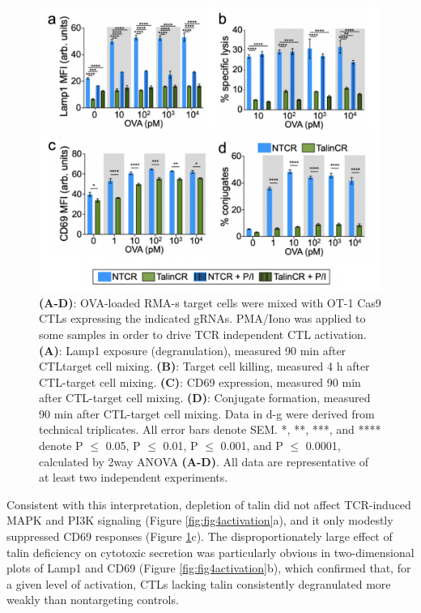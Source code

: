 \begin{figure}[htbp]
	\centering
	\includegraphics[width=1.0\columnwidth]{../figures/chapter3/fig4assays.png}
	\caption{Talin is required for LFA-1 mediated degranulation, and cytotoxicity.}
	\caption*{\textbf{(A-D)}: OVA-loaded RMA-s target cells were mixed with OT-1 Cas9 CTLs expressing the indicated gRNAs. PMA/Iono was applied to some samples in order to drive TCR independent CTL activation. \textbf{(A)}: Lamp1 exposure (degranulation), measured 90 min after CTLtarget cell mixing. \textbf{(B)}: Target cell killing, measured 4 h after CTL-target cell mixing. \textbf{(C)}: CD69 expression, measured 90 min after CTL-target cell mixing. \textbf{(D)}: Conjugate formation, measured 90 min after CTL-target cell mixing. Data in d-g were derived from technical triplicates. All error bars denote SEM. *, **, ***, and **** denote P $\leq$ 0.05, P $\leq$ 0.01, P $\leq$ 0.001, and P $\leq$ 0.0001, calculated by 2way ANOVA \textbf{(A-D)}. All data are representative of at least two independent experiments.}
	\label{fig:fig4assays}
\end{figure} 

Consistent with this interpretation, depletion of talin did not affect TCR-induced MAPK and PI3K signaling (Figure \ref{fig:fig4activation}a), and it only modestly suppressed CD69 responses (Figure \ref{fig:fig4assays}c). The disproportionately large effect of talin deficiency on cytotoxic secretion was particularly obvious in two-dimensional plots of Lamp1 and CD69 (Figure \ref{fig:fig4activation}b), which confirmed that, for a given level of activation, CTLs lacking talin consistently degranulated more weakly than nontargeting controls. 


